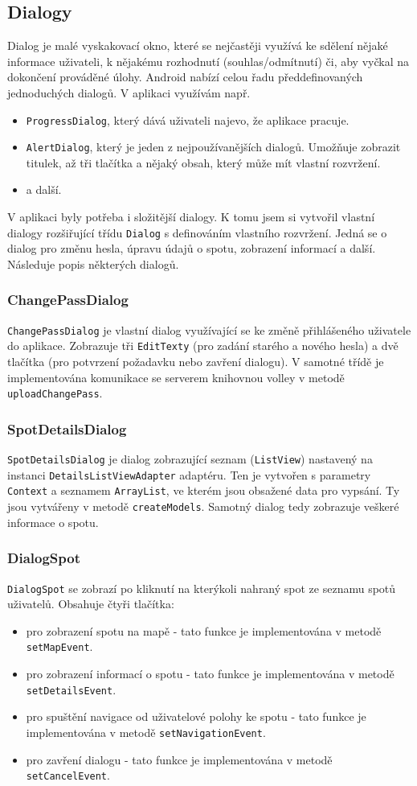 \documentclass[12pt]{article}
\begin{document}
\subsection{Dialogy}
Dialog je malé vyskakovací okno, které se nejčastěji využívá ke sdělení nějaké informace uživateli, k nějakému rozhodnutí (souhlas/odmítnutí) či, aby vyčkal na dokončení prováděné úlohy. Android nabízí celou řadu předdefinovaných jednoduchých dialogů. V aplikaci využívám např.
\begin{itemize}
\item \verb+ProgressDialog+, který dává uživateli najevo, že aplikace pracuje.
\item \verb+AlertDialog+, který je jeden z nejpoužívanějších dialogů. Umožňuje zobrazit titulek, až tři tlačítka a nějaký obsah, který může mít vlastní rozvržení.
\item a další.
\end{itemize}
V aplikaci byly potřeba i složitější dialogy. K tomu jsem si vytvořil vlastní dialogy rozšiřující třídu \verb+Dialog+ s definováním vlastního rozvržení. Jedná se o dialog pro změnu hesla, úpravu údajů o spotu, zobrazení informací a další. Následuje popis některých dialogů.
\subsubsection{ChangePassDialog}
\verb+ChangePassDialog+ je vlastní dialog využívající se ke změně přihlášeného uživatele do aplikace. Zobrazuje tři \verb+EditTexty+ (pro zadání starého a nového hesla) a dvě tlačítka (pro potvrzení požadavku nebo zavření dialogu). V samotné třídě je implementována komunikace se serverem knihovnou volley v metodě \verb+uploadChangePass+.
\subsubsection{SpotDetailsDialog}
\label{details}
\verb+SpotDetailsDialog+ je dialog zobrazující seznam (\verb+ListView+) nastavený na instanci \verb+DetailsListViewAdapter+ adaptéru. Ten je vytvořen s parametry \verb+Context+ a seznamem \verb+ArrayList+, ve kterém jsou obsažené data pro vypsání. Ty jsou vytvářeny v metodě \verb+createModels+. Samotný dialog tedy zobrazuje veškeré informace o spotu.
\subsubsection{DialogSpot}
\verb+DialogSpot+ se zobrazí po kliknutí na kterýkoli nahraný spot ze seznamu spotů uživatelů. Obsahuje čtyři tlačítka:
\begin{itemize}
\item pro zobrazení spotu na mapě - tato funkce je implementována v metodě \verb+setMapEvent+.
\item pro zobrazení informací o spotu - tato funkce je implementována v metodě \verb+setDetailsEvent+.
\item pro spuštění navigace od uživatelové polohy ke spotu - tato funkce je implementována v metodě \verb+setNavigationEvent+.
\item pro zavření dialogu - tato funkce je implementována v metodě \verb+setCancelEvent+.
\end{itemize}
\end{document}
